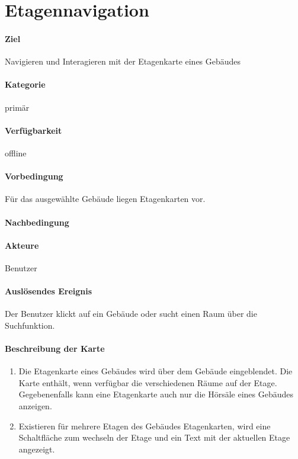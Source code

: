 \section{Etagennavigation}
\paragraph{Ziel}
Navigieren und Interagieren mit der Etagenkarte eines Gebäudes
\paragraph{Kategorie}
primär
\paragraph{Verfügbarkeit}
offline
\paragraph{Vorbedingung}
Für das ausgewählte Gebäude liegen Etagenkarten vor.
\paragraph{Nachbedingung}

\paragraph{Akteure}
Benutzer
\paragraph{Auslösendes Ereignis}
Der Benutzer klickt auf ein Gebäude oder sucht einen Raum über die Suchfunktion.
\paragraph{Beschreibung der Karte}
\begin{enumerate}
    \item Die Etagenkarte eines Gebäudes wird über dem Gebäude eingeblendet. Die Karte enthält, wenn verfügbar die verschiedenen Räume auf der Etage. Gegebenenfalls kann eine Etagenkarte auch nur die Hörsäle eines Gebäudes anzeigen.
    \item Existieren für mehrere Etagen des Gebäudes Etagenkarten, wird eine Schaltfläche zum wechseln der Etage und ein Text mit der aktuellen Etage angezeigt.
\end{enumerate}
